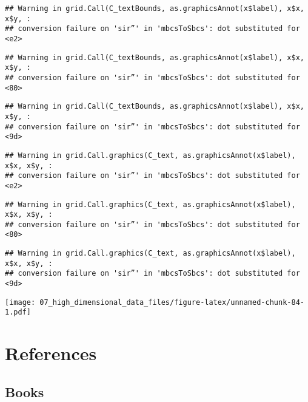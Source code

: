 \documentclass[
]{book}
\begin{document}
\begin{verbatim}
## Warning in grid.Call(C_textBounds, as.graphicsAnnot(x$label), x$x, x$y, :
## conversion failure on 'sir”' in 'mbcsToSbcs': dot substituted for <e2>
\end{verbatim}

\begin{verbatim}
## Warning in grid.Call(C_textBounds, as.graphicsAnnot(x$label), x$x, x$y, :
## conversion failure on 'sir”' in 'mbcsToSbcs': dot substituted for <80>
\end{verbatim}

\begin{verbatim}
## Warning in grid.Call(C_textBounds, as.graphicsAnnot(x$label), x$x, x$y, :
## conversion failure on 'sir”' in 'mbcsToSbcs': dot substituted for <9d>
\end{verbatim}

\begin{verbatim}
## Warning in grid.Call.graphics(C_text, as.graphicsAnnot(x$label), x$x, x$y, :
## conversion failure on 'sir”' in 'mbcsToSbcs': dot substituted for <e2>
\end{verbatim}

\begin{verbatim}
## Warning in grid.Call.graphics(C_text, as.graphicsAnnot(x$label), x$x, x$y, :
## conversion failure on 'sir”' in 'mbcsToSbcs': dot substituted for <80>
\end{verbatim}

\begin{verbatim}
## Warning in grid.Call.graphics(C_text, as.graphicsAnnot(x$label), x$x, x$y, :
## conversion failure on 'sir”' in 'mbcsToSbcs': dot substituted for <9d>
\end{verbatim}

\texttt{[image: 07\_high\_dimensional\_data\_files/figure-latex/unnamed-chunk-84-1.pdf]}

\hypertarget{references-4}{%
\section{References}\label{references-4}}

\hypertarget{books}{%
\subsection{Books}\label{books}}
\end{document}
